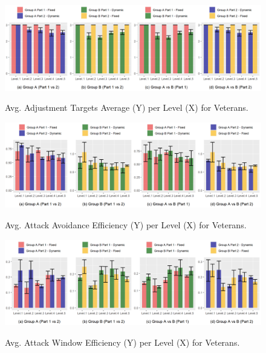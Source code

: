 \begin{figure}[!ht]
    \begin{center}
    \caption{Avg. Adjustment Targets Average (Y) per Level (X) for Veterans.}
        \includegraphics[width=34em]{figures/adjustment_target_level-veteran_players.png}
    \label{fig:result-metric-veteran-adjustment-target-level}
    \end{center}
\end{figure}

\begin{figure}[!ht]
    \begin{center}
        \caption{Avg. Attack Avoidance Efficiency (Y) per Level (X) for Veterans.}
        \includegraphics[width=34em]{figures/attack_avoidance_efficiency-veteran_players.png}
    \label{fig:result-metric-veterans-attack-avoidance-efficiency}
    \end{center}
\end{figure}

\begin{figure}[!ht]
    \begin{center}
    \caption{Avg. Attack Window Efficiency (Y) per Level (X) for Veterans.}
        \includegraphics[width=34em]{figures/attack_window_efficiency-veteran_players.png}
    \label{fig:result-metric-veterans-attack-window-efficiency}
    \end{center}
\end{figure}

